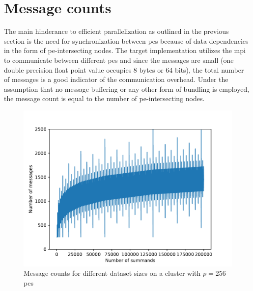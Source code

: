 \section{Message counts}
The main hinderance to efficient parallelization as outlined in the previous section is the need for synchronization between \glspl{pe} because of data dependencies in the form of \gls{pe}-intersecting nodes.
The target implementation utilizes the \gls{mpi} to communicate between different \glspl{pe} and since the messages are small (one double precision float point value occupies 8 bytes or 64 bits), the total number of messages is a good indicator of the communication overhead.
Under the assumption that no message buffering or any other form of bundling is employed, the message count is equal to the number of \gls{pe}-intersecting nodes.

\begin{figure}
\centering
\includegraphics[scale=0.7]{figures/message_count_256.pdf}
\caption{Message counts for different dataset sizes on a cluster with $p=256$ \glspl{pe}}
\label{fig:messageCount256}
\end{figure}


